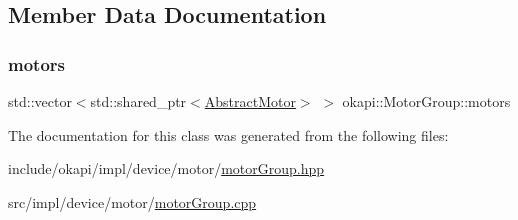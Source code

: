 \subsection{Member Data Documentation}
\mbox{\label{classokapi_1_1MotorGroup_a025b488e3877fc4b0aa032c57f6ba1d4}} 
\subsubsection{\texorpdfstring{motors}{motors}}
{\footnotesize\ttfamily std\+::vector$<$std\+::shared\+\_\+ptr$<$\mbox{\hyperlink{classokapi_1_1AbstractMotor}{Abstract\+Motor}}$>$ $>$ okapi\+::\+Motor\+Group\+::motors\hspace{0.3cm}{\ttfamily [protected]}}



The documentation for this class was generated from the following files\+:\begin{DoxyCompactItemize}
\item 
include/okapi/impl/device/motor/\mbox{\hyperlink{motorGroup_8hpp}{motor\+Group.\+hpp}}\item 
src/impl/device/motor/\mbox{\hyperlink{motorGroup_8cpp}{motor\+Group.\+cpp}}\end{DoxyCompactItemize}
